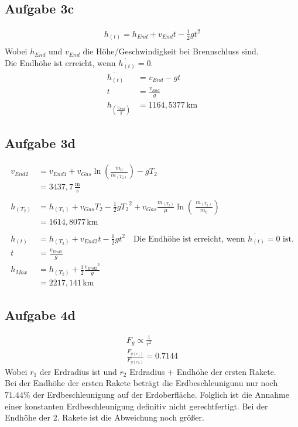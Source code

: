 \documentclass[a4paper,10pt]{extarticle}
\begin{document}
\subsection*{Aufgabe 3c}
\begin{align*}
h_{(t)} = h_{End} + v_{End}t - \frac{1}{2}gt^2 \\
\end{align*}
Wobei $h_{End}$ und $v_{End}$ die Höhe/Geschwindigkeit bei Brennschluss sind. \\
Die Endhöhe ist erreicht, wenn $\dot{h_{(t)}} = 0$.
\begin{align*}
\dot{h_{(t)}} &= v_{End} - gt \\
t &= \frac{v_{End}}{g} \\
h_{(\frac{v_{End}}{g})} &= 1164,5377 \, \mbox{km}
\end{align*}

\subsection*{Aufgabe 3d}
\begin{align*}
v_{End2} &= v_{End1} + v_{Gas} \ln\left( \frac{m_0}{m_{(T_2)}} \right) - gT_2 \\
&= 3437,7 \, \frac{\mbox{m}}{\mbox{s}} \\ \\
h_{(T_2)} &= h_{(T_1)} + v_{Gas}T_2 - \frac{1}{2}g{T_2}^2 + v_{Gas} \frac{m_{(T_2)}}{\mu}\ln\left(\ \frac{m_{(T_2)}}{m_0} \right) \\
&= 1614,8077 \, \mbox{km} \\ \\
h_{(t)} &= h_{(T_2)} + v_{End2}t - \frac{1}{2}gt^2 \quad \mbox{Die Endhöhe ist erreicht, wenn $\dot{h_{(t)}} = 0$ ist.} \\
t &= \frac{v_{End2}}{g} \\
h_{Max} &= h_{(T_2)} + \frac{1}{2} \frac{{v_{End2}}^2}{g} \\
&= 2217,141 \, \mbox{km}
\end{align*}

\subsection*{Aufgabe 4d}
\begin{align*}
F_g \propto \frac{1}{r^2} \\
\frac{F_{g(r_1)}}{F_{g(r_2)}} = 0.7144 
\end{align*}
Wobei $r_1$ der Erdradius ist und $r_2$ Erdradius $+$ Endhöhe der ersten Rakete. \\
Bei der Endhöhe der ersten Rakete beträgt die Erdbeschleunigunu nur noch $71.44\%$ der Erdbeschleunigung auf der Erdoberfläche. Folglich ist die Annahme einer konstanten Erdbeschleunigung definitiv nicht gerechtfertigt. Bei der Endhöhe der 2. Rakete ist die Abweichung noch größer.
\end{document}
